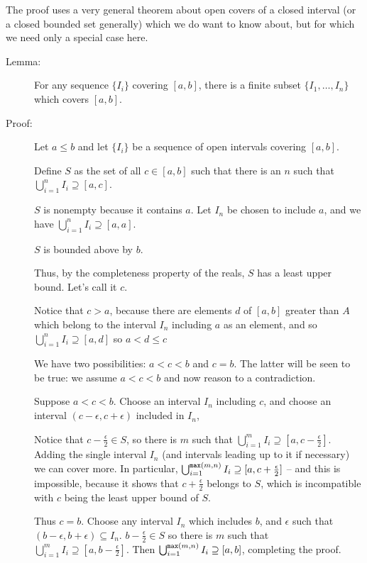 \documentclass[12pt]{article}
\begin{document}
\begin{description}
The proof uses a very general theorem about open covers of a closed interval (or a closed bounded set generally) which we do want to know about, but for which we need only a special case here.

\begin{description}

\item[Lemma:]  For any sequence $\{I_i\}$ covering $[a,b]$, there is a finite subset $\{I_1,\ldots,I_n\}$ which covers $[a,b]$.

\item[Proof:]  Let $a \leq b$ and let $\{I_i\}$ be a sequence of open intervals covering $[a,b]$.

Define $S$ as the set of all $c \in [a,b]$ such that there is an $n$ such that $\bigcup_{i=1}^n I_i \supseteq [a,c]$.

$S$ is nonempty because it contains $a$.  Let $I_n$ be chosen to include $a$, and we have $\bigcup_{i=1}^n I_i \supseteq [a,a]$.

$S$ is bounded above by $b$.

Thus, by the completeness property of the reals, $S$ has a least upper bound.  Let's call it $c$.

Notice that $c>a$, because there are elements $d$ of $[a,b]$ greater than $A$ which belong to the interval $I_n$ including $a$ as an element, and so $\bigcup_{i=1}^n I_i \supseteq [a,d]$
so $a <d \leq c$

We have two possibilities:  $a<c<b$ and $c=b$.  The latter will be seen to be true:  we assume $a<c<b$ and now reason to a contradiction.

Suppose $a<c<b$.  Choose an interval $I_n$ including $c$, and choose an interval $(c-\epsilon, c+\epsilon)$ included in $I_n$,

Notice that $c-\frac\epsilon2 \in S$, so there is $m$ such that $\bigcup_{i=1}^m I_i \supseteq [a,c-\frac\epsilon2]$.  Adding the single interval $I_n$ (and intervals leading up to it if necessary) we can cover more.  In particular, $\bigcup_{i=1}^{{\tt max}(m,n)} I_i \supseteq [a,c+\frac\epsilon2]$ -- and this is impossible, because it shows that $c+\frac\epsilon2$ belongs to $S$, which is incompatible with $c$ being the least upper bound of $S$.

Thus $c=b$.  Choose any interval $I_n$ which includes $b$, and $\epsilon$ such that $(b-\epsilon,b+\epsilon) \subseteq I_n$.  $b-\frac\epsilon2 \in S$ so there is $m$ such that $\bigcup_{i=1}^m I_i \supseteq [a,b-\frac\epsilon2]$.   Then  $\bigcup_{i=1}^{{\tt max}(m,n)} I_i \supseteq [a,b]$, completing the proof.


\end{description}
\end{description}
\end{document}
